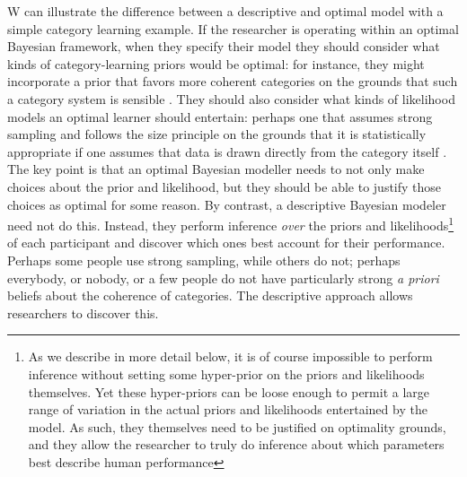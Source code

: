 W can illustrate the difference between a descriptive and optimal model with a simple category learning example. If the researcher is operating within an optimal Bayesian framework, when they specify their model they should consider what kinds of category-learning priors would be optimal: for instance, they might incorporate a prior that favors more coherent categories \cite{rosch78} on the grounds that such a category system is sensible \cite{navarro_hypothesis_2011}. They should also consider what kinds of likelihood models an optimal learner should entertain: perhaps one that assumes strong sampling and follows the size principle on the grounds that it is statistically appropriate if one assumes that data is drawn directly from the category itself \cite{Tenenbaum2001}. The key point is that an optimal Bayesian modeller needs to not only make choices about the prior and likelihood, but they should be able to justify those choices as optimal for some reason. By contrast, a descriptive Bayesian modeler need not do this. Instead, they perform inference {\it over} the priors and likelihoods\footnote{As we describe in more detail below, it is of course impossible to perform inference without setting some hyper-prior on the priors and likelihoods themselves. Yet these hyper-priors can be loose enough to permit a large range of variation in the actual priors and likelihoods entertained by the model. As such, they themselves need to be justified on optimality grounds, and they allow the researcher to truly do inference about which parameters best describe human performance} of each participant and discover which ones best account for their performance. Perhaps some people use strong sampling, while others do not; perhaps everybody, or nobody, or a few people do not have particularly strong {\it a priori} beliefs about the coherence of categories. The descriptive approach allows researchers to discover this. 

